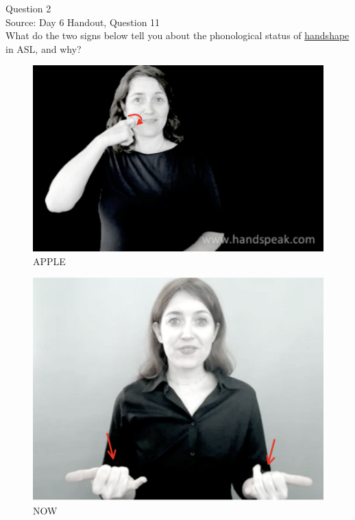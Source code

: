 \documentclass[12pt]{article}
\begin{document}
\newpage

{\large Question 2}\\

Source: Day 6 Handout, Question 11\\

What do the two signs below tell you about the phonological status of \underline{handshape} in ASL, and why?\\

\begin{figure}[H]
\includegraphics{../images/asl_apple.png}
\caption{APPLE}
\end{figure}
\begin{figure}[H]
\includegraphics{../images/asl_now.png}
\caption{NOW}
\end{figure}

\newpage
\end{document}
